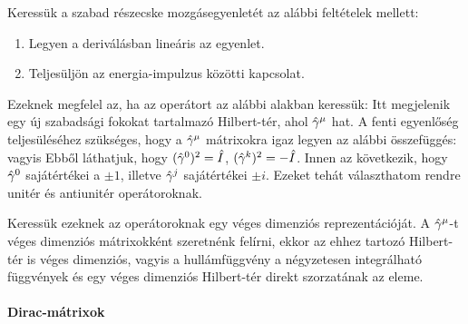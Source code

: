    Keressük a szabad részecske mozgásegyenletét az alábbi feltételek mellett:
   \begin{enumerate}
    \item Legyen a deriválásban lineáris az egyenlet.
    \item Teljesüljön az energia-impulzus közötti kapcsolat.
   \end{enumerate}
   Ezeknek megfelel az, ha az operátort az alábbi alakban keressük:
    Itt megjelenik egy új szabadsági fokokat tartalmazó Hilbert-tér, ahol $\hat{\gamma}^\mu$ hat. A fenti egyenlőség teljesüléséhez szükséges, hogy a $\hat{\gamma}^\mu$ mátrixokra igaz legyen az alábbi összefüggés:
   vagyis
   Ebből láthatjuk, hogy $(\hat{\gamma}^0)^2=\hat{I}$, $(\hat{\gamma}^k)^2=-\hat{I}$. Innen az következik, hogy $\hat{\gamma}^0$ sajátértékei a $\pm1$, illetve $\hat{\gamma}^j$ sajátértékei $\pm i$. Ezeket tehát választhatom rendre unitér és antiunitér operátoroknak. 
   
   Keressük ezeknek az operátoroknak egy véges dimenziós reprezentációját. A $\hat{\gamma}^\mu$-t véges dimenziós mátrixokként szeretnénk felírni, ekkor az ehhez tartozó Hilbert-tér is véges dimenziós, vagyis a hullámfüggvény a négyzetesen integrálható függvények és egy véges dimenziós Hilbert-tér direkt szorzatának az eleme.
   
   \paragraph{Dirac-mátrixok}
    
